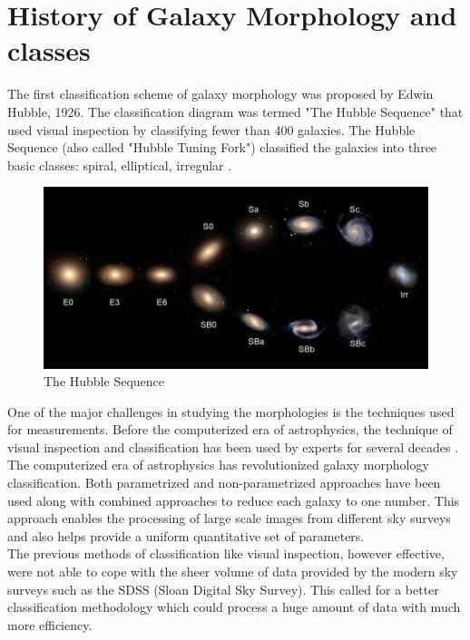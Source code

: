 \documentclass[a4paper,12pt]{report}
\begin{document}
\section{History of Galaxy Morphology and classes}
\hspace*{0.5 in}The first classification scheme of galaxy morphology was proposed by Edwin Hubble, 1926. The classification diagram was termed "The Hubble Sequence" that used visual inspection by classifying fewer than 400 galaxies. The Hubble Sequence (also called "Hubble Tuning Fork") classified the galaxies into three basic classes: spiral, elliptical, irregular \citep{hubble1926extragalactic}.\\
\begin{figure}[t]
\begin{center}
\includegraphics[width=\textwidth, height=.5\textheight]{figures/HubbleTuningFork2.jpg}
\caption{The Hubble Sequence}
\label{HubbleTuningFork}
\end{center}
\end{figure}
\hspace*{0.5 in}One of the major challenges in studying the morphologies is the techniques used for measurements. Before the computerized era of astrophysics, the technique of visual inspection and classification has been used by experts for several decades \citep{hubble1926extragalactic,Vaucouleurs,Edmondson464,VanDenBergh}.\\
\hspace*{0.5 in}The computerized era of astrophysics has revolutionized galaxy morphology classification. Both parametrized \citep{1968adga.book.....S,Cohen} and non-parametrized approaches have been used along with combined approaches \citep{2003ApJS..147....1C,2004AJ....128..163L} to reduce each galaxy to one number. This approach enables the processing of large scale images from different sky surveys \citep{Djorgovski_2013} and also helps provide a uniform quantitative set of parameters.\\
\hspace*{0.5 in}The previous methods of classification like visual inspection, however effective, were not able to cope with the sheer volume of data provided by the modern sky surveys such as the SDSS (Sloan Digital Sky Survey). This called for a better classification methodology which could process a huge amount of data with much more efficiency.
\end{document}
